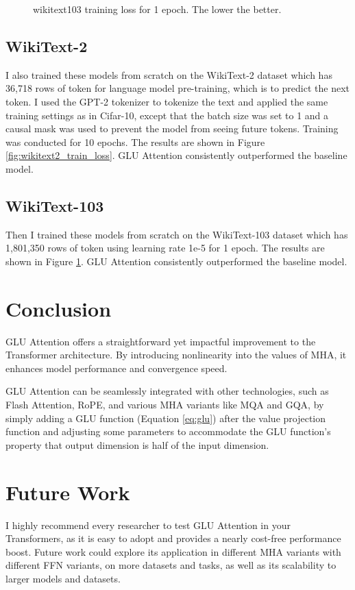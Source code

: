 \documentclass[11pt]{article}
\begin{document}
\begin{figure}[htbp]
\begin{minipage}{0.49\textwidth}
        \caption{wikitext103 training loss for 1 epoch. The lower the better.}
        \label{fig:wikitext103_train_loss}
    \end{minipage}
    \hfill
\end{figure}


\subsection{WikiText-2}



I also trained these models from scratch on the WikiText-2 dataset which has 36,718 rows of token for language model pre-training, which is to predict the next token. I used the GPT-2 tokenizer to tokenize the text and applied the same training settings as in Cifar-10, except that the batch size was set to 1 and a causal mask was used to prevent the model from seeing future tokens. Training was conducted for 10 epochs. The results are shown in Figure \ref{fig:wikitext2_train_loss}. GLU Attention consistently outperformed the baseline model.

\subsection{WikiText-103}

Then I trained these models from scratch on the WikiText-103 dataset which has 1,801,350 rows of token using learning rate 1e-5 for 1 epoch. The results are shown in Figure \ref{fig:wikitext103_train_loss}. GLU Attention consistently outperformed the baseline model.

\section{Conclusion}

GLU Attention offers a straightforward yet impactful improvement to the Transformer architecture. By introducing nonlinearity into the values of MHA, it enhances model performance and convergence speed.

GLU Attention can be seamlessly integrated with other technologies, such as Flash Attention\cite{dao2022flashattentionfastmemoryefficientexact}, RoPE\cite{su2023roformerenhancedtransformerrotary}, and various MHA variants like MQA and GQA\cite{ainslie2023gqatraininggeneralizedmultiquery}, by simply adding a GLU function (Equation \ref{eq:glu}) after the value projection function and adjusting some parameters to accommodate the GLU function's property that output dimension is half of the input dimension.

\section{Future Work}
I highly recommend every researcher to test GLU Attention in your Transformers, as it is easy to adopt and provides a nearly cost-free performance boost. Future work could explore its application in different MHA variants with different FFN variants, on more datasets and tasks, as well as its scalability to larger models and datasets.



\end{document}
